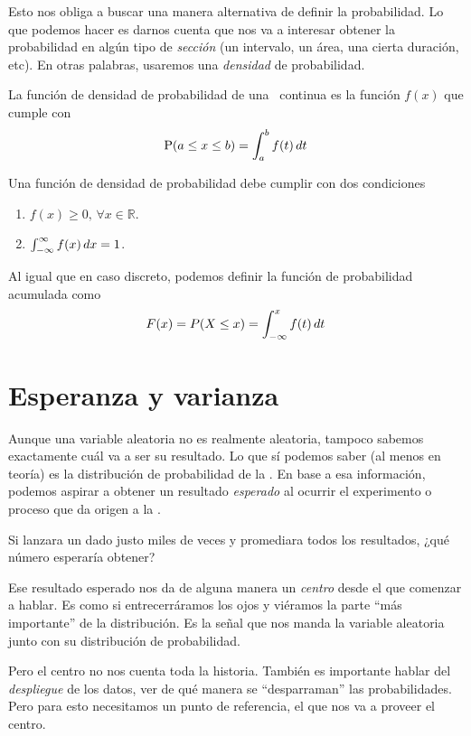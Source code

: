 Esto nos obliga a buscar una manera alternativa de definir la probabilidad. Lo que podemos hacer es darnos cuenta que nos va a interesar obtener la probabilidad en algún tipo de \emph{sección} (un intervalo, un área, una cierta duración, etc). En otras palabras, usaremos una \emph{densidad} de probabilidad.

\begin{definition}
La función de densidad de probabilidad de una \va\ continua es la función \(f(x)\) que cumple con \[\operatorname{P}(a\leq x \leq b) = \int_{a}^{b} f(t)\mathop{dt}\]
\end{definition}

Una función de densidad de probabilidad debe cumplir con dos condiciones
\begin{enumerate}
  \item \(f(x)\geq0,\, \forall x \in \mathbb{R}\).
  \item \(\int_{-\infty}^{\infty}f(x)\mathop{dx}=1\).
\end{enumerate}

Al igual que en caso discreto, podemos definir la función de probabilidad acumulada como \[F(x) = P(X\leq x) = \int_{-\infty}^{x}f(t)\mathop{dt}\]

\section{Esperanza y varianza}

Aunque una variable aleatoria no es realmente aleatoria, tampoco sabemos exactamente cuál va a ser su resultado. Lo que sí podemos saber (al menos en teoría) es la distribución de probabilidad de la \va. En base a esa información, podemos aspirar a obtener un resultado \emph{esperado} al ocurrir el experimento o proceso que da origen a la \va.

\begin{pausa}
Si lanzara un dado justo miles de veces y promediara todos los resultados, ¿qué número esperaría obtener?
\end{pausa}

Ese resultado esperado nos da de alguna manera un \emph{centro} desde el que comenzar a hablar. Es como si entrecerráramos los ojos y viéramos la parte \enquote{más importante} de la distribución. Es la señal que nos manda la variable aleatoria junto con su distribución de probabilidad.

Pero el centro no nos cuenta toda la historia. También es importante hablar del \emph{despliegue} de los datos, ver de qué manera se \enquote{desparraman} las probabilidades. Pero para esto necesitamos un punto de referencia, el que nos va a proveer el centro.

